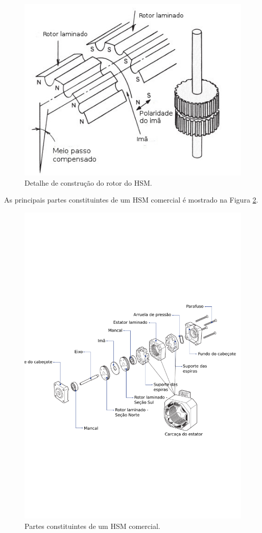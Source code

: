\begin{figure}[H]
	\centering
	\includegraphics[width = \columnwidth]{Images/VR_ROTOR.jpg}
	\caption{Detalhe de construção do rotor do HSM. \cite{angulo_rotor}}
	\label{fig:HSM_dentes}
\end{figure}

As principais partes constituintes de um HSM comercial é mostrado na Figura \ref{fig:partes_SM}.

\begin{figure}[H]
	\centering
	\includegraphics[width = \columnwidth]{Images/partes_HSM.pdf}
	\caption{Partes constituintes de um HSM comercial. \cite{MoonsHSM}}
	\label{fig:partes_SM}
\end{figure}
